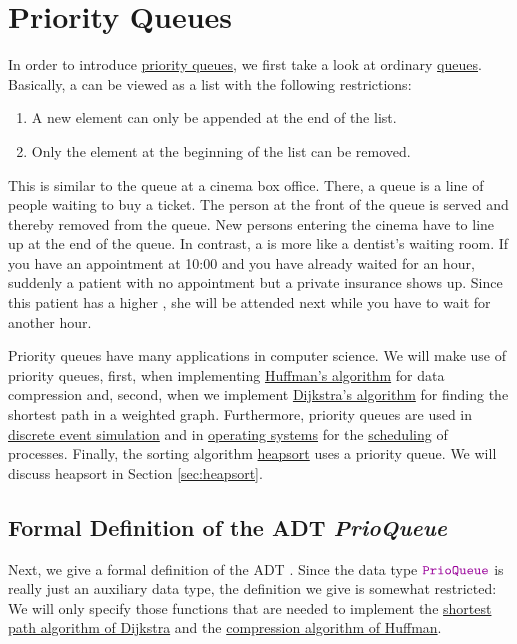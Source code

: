 \chapter{Priority Queues \label{chap:prioqueue}}
In order to introduce \href{https://en.wikipedia.org/wiki/Priority_queue}{priority queues},
we first take a look at ordinary
\href{https://en.wikipedia.org/wiki/Queue_(abstract_data_type)}{queues}.
Basically, a  can be viewed as a list with the following restrictions:
\begin{enumerate}
\item A new element can only be appended at the end of the list.
\item Only the element at the beginning of the list can be removed.
\end{enumerate}
This is similar to the queue at a cinema box office.  There, a queue is a line of people
waiting to buy a ticket.  The person at the front of the queue is served and thereby removed from
the queue.  New persons entering the cinema have to line up at the end of the queue.  In contrast, a
 is more like a dentist's waiting room.  If you have an appointment at 10:00 and you
have already waited for an hour, suddenly a patient with no appointment but a private insurance
shows up.  Since this patient has a higher , she will be attended next while you have
to wait for another hour. 

Priority queues have many applications in computer science.  We will make use of priority queues,
first, when implementing \href{https://en.wikipedia.org/wiki/Huffman_coding}{Huffman's algorithm}
for data compression and, second, when we implement
\href{https://en.wikipedia.org/wiki/Dijkstra%27s_algorithm}{Dijkstra's algorithm} 
for finding the shortest path in a weighted graph.  Furthermore, priority 
queues are used in \href{https://en.wikipedia.org/wiki/Discrete_event_simulation}{discrete event simulation}
and in \href{https://en.wikipedia.org/wiki/Operating_system}{operating systems} for the
\href{https://en.wikipedia.org/wiki/Scheduling_(computing)}{scheduling} of 
processes. Finally, the sorting algorithm \href{https://en.wikipedia.org/wiki/Heapsort}{heapsort} uses a
priority queue. We will discuss heapsort in Section \ref{sec:heapsort}.

\section[Formal Definition]{Formal Definition of the ADT \textsl{PrioQueue}}
Next, we give a formal definition of the ADT .  Since the data type
$\mytt{PrioQueue}$ is really just an auxiliary data type, the definition we give is somewhat
restricted: We will only specify those functions that are needed to implement
the \hyperref[sec:dijkstra]{shortest path algorithm of Dijkstra} and the
\hyperref[sec:huffman]{compression algorithm of Huffman}.

